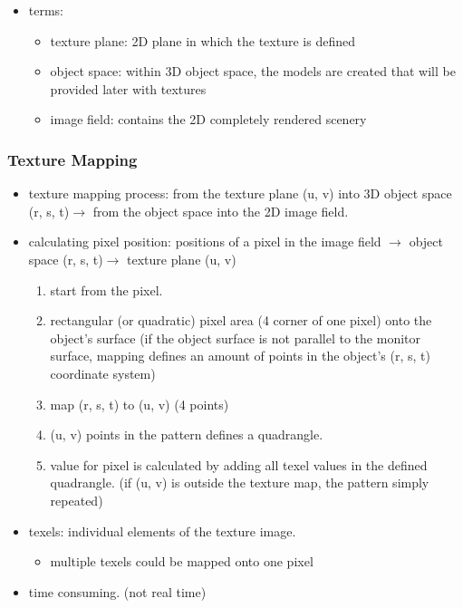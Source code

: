 \documentclass{standalone}
\begin{document}
\begin{itemize}
	\item terms:
		\begin{itemize}
			\item texture plane: 2D plane in which the texture is defined
			\item object space: within 3D object space, the models are created that will be provided later with textures
			\item image field: contains the 2D completely rendered scenery
		\end{itemize}
\end{itemize}

\subsubsection*{Texture Mapping}
       
\begin{itemize}
	\item texture mapping process: from the texture plane (u, v) into 3D object space (r, s, t)$\rightarrow$ from the object space into the 2D image field.
	\item calculating pixel position: positions of a pixel in the image field $\rightarrow$ object space (r, s, t)$\rightarrow$ texture plane (u, v)
		\begin{enumerate}
			\item start from the pixel. 
			\item rectangular (or quadratic) pixel area (4 corner of one pixel) onto the object's surface (if the object surface is not parallel to the monitor surface, mapping defines an amount of points in the object's (r, s, t) coordinate system)
			\item map (r, s, t) to (u, v) (4 points) 
			\item (u, v) points in the pattern defines a quadrangle. 
			\item value for pixel is calculated by adding all texel values in the defined quadrangle. (if (u, v) is outside the texture map, the pattern simply repeated)
		\end{enumerate}
	\item texels: individual elements of the texture image.
		\begin{itemize}
			\item multiple texels could be mapped onto one pixel
		\end{itemize}
	\item time consuming. (not real time)
\end{itemize}
\end{document}

